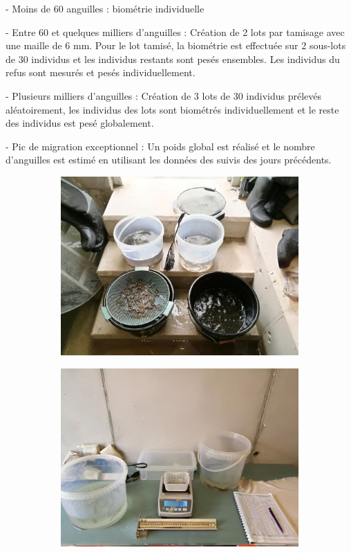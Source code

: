 \documentclass[11pt,titlepage,twoside]{article}\usepackage[]{graphicx}\usepackage[table]{xcolor}
\begin{document}
- Moins de 60 anguilles : biométrie individuelle

- Entre 60 et quelques milliers d'anguilles : Création de 2 lots par tamisage avec une maille de 6 mm. Pour le lot tamisé, la biométrie est effectuée sur 2 sous-lots de 30 individus et les individus restants sont pesés ensembles. Les individus du refus sont mesurés et pesés individuellement.

- Plusieurs milliers d'anguilles : Création de 3 lots de 30 individus prélevés aléatoirement, les individus des lots sont biométrés individuellement et le reste des individus est pesé globalement.

- Pic de migration exceptionnel : Un poids global est réalisé et le nombre d'anguilles est estimé en utilisant les données des suivis des jours précédents.

\begin{figure}[hptb]
    \centering
    \begin{subfigure}[b]{0.4\textwidth}
        \includegraphics[width=\textwidth]{tamis_ang}
    \end{subfigure}
    \begin{subfigure}[b]{0.4\textwidth}
        \includegraphics[width=\textwidth]{biometrie_ang}

\end{subfigure}
\end{figure}
\end{document}
